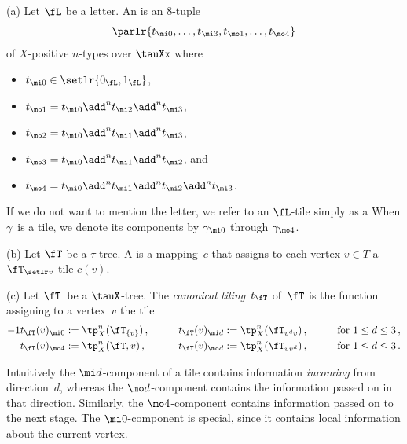 \documentclass{LMCS}
\begin{document}
\begin{defi}
\textup{(a)}
Let $\fL$ be a letter.
An  is an $8$-tuple
\begin{align*}
  \parlr{t_{\mi0},\dots,t_{\mi3},t_{\mo1},\dots,t_{\mo4}}
\end{align*}
of $X$-positive $n$-types over $\tauXx$ where
\begin{itemize}
\item $t_{\mi0}\in\setlr{0_{\fL},1_{\fL}}$,
\item $t_{\mo1} = t_{\mi0} \add^n t_{\mi2} \add^n t_{\mi3}$,
\item $t_{\mo2} = t_{\mi0} \add^n t_{\mi1} \add^n t_{\mi3}$,
\item $t_{\mo3} = t_{\mi0} \add^n t_{\mi1} \add^n t_{\mi2}$, and
\item $t_{\mo4} = t_{\mi0} \add^n t_{\mi1} \add^n t_{\mi2} \add^n t_{\mi3}$.
\end{itemize}
If we do not want to mention the letter,
we refer to an $\fL$-tile simply as a 
When $\gamma$~is a tile,
we denote its components by $\gamma_{\mi0}$ through $\gamma_{\mo4}$.

\textup{(b)}
Let $\fT$ be a $\tau$-tree.
A  is a mapping~$c$ that assigns to each
vertex $v \in T$ a $\fT_{\setlr v}$-tile $c(v)$.

\textup{(c)}
Let $\fT$~be a $\tauX$-tree.
The \emph{canonical tiling}~$t_\fT$ of~$\fT$ is the function
assigning to a vertex~$v$ the tile
\begin{alignat*}{-1}
    t_\fT(v)_{\mi 0} &:= \tp_X^n(\fT_{\{v\}})\,, \qquad
  & t_\fT(v)_{\mi d} &:= \tp_X^n(\fT_{v^dv})\,,
  &&\qquad\text{for } 1 \leq d \leq 3\,, \\
    t_\fT(v)_{\mo 4} &:= \tp_X^n(\fT,v)\,, \qquad
  & t_\fT(v)_{\mo d} &:= \tp_X^n(\fT_{vv^d})\,,
  &&\qquad\text{for } 1 \leq d \leq 3\,.
\end{alignat*}
\end{defi}

Intuitively the $\mi d$-component of a tile
contains information \emph{incoming} from direction~$d$,
whereas the $\mo d$-component contains the information passed on in that direction.
Similarly, the $\mo 4$-component contains information passed on to the next stage.
The $\mi 0$-component is special, since it contains local information about the current vertex.
\end{document}
